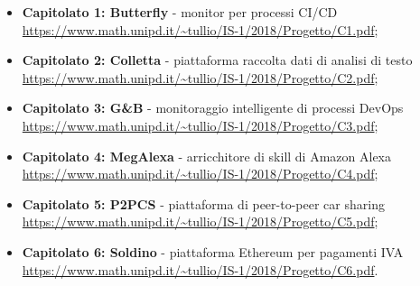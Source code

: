\begin{itemize}
\item \textbf{Capitolato 1: Butterfly} - monitor per processi CI/CD \\
\url{https://www.math.unipd.it/~tullio/IS-1/2018/Progetto/C1.pdf};\phantom{.}

\item \textbf{Capitolato 2: Colletta} - piattaforma raccolta dati di analisi di testo\\
\url{https://www.math.unipd.it/~tullio/IS-1/2018/Progetto/C2.pdf};\phantom{.}

\item \textbf{Capitolato 3: G\&B} - monitoraggio intelligente di processi DevOps\\
\url{https://www.math.unipd.it/~tullio/IS-1/2018/Progetto/C3.pdf};\phantom{.}

\item \textbf{Capitolato 4: MegAlexa} - arricchitore di skill di Amazon Alexa\\
\url{https://www.math.unipd.it/~tullio/IS-1/2018/Progetto/C4.pdf};\phantom{.}

\item \textbf{Capitolato 5: P2PCS} - piattaforma di peer-to-peer car sharing\\
\url{https://www.math.unipd.it/~tullio/IS-1/2018/Progetto/C5.pdf};\phantom{.}

\item \textbf{Capitolato 6: Soldino} - piattaforma Ethereum per pagamenti IVA\\
\url{https://www.math.unipd.it/~tullio/IS-1/2018/Progetto/C6.pdf}.

\end{itemize}
